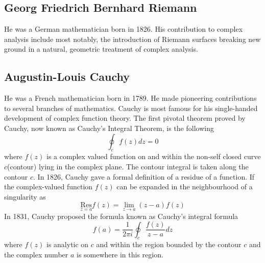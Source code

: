 \documentclass[12pt]{report}
\newcommand{\sps}{\\[0.2cm]}
\begin{document}
	\begin{center}
	\end{center}

	\subsection{Georg Friedrich Bernhard Riemann}
	He was a German mathematician born in 1826. His contribution to complex analysis include most notably, the introduction of Riemann surfaces breaking new ground in a natural, geometric treatment of complex analysis.
	
	\subsection{Augustin-Louis Cauchy}
	He was a French mathematician born in 1789. He made pioneering contributions to several branches of mathematics. Cauchy is most famous for his single-handed development of complex function theory. The first pivotal theorem proved by Cauchy, now known as Cauchy's Integral Theorem, is the following
	\begin{equation}
		\oint_c f(z)dz=0
	\end{equation}
	where $f(z)$ is a complex valued function on and within the non-self closed curve $c$(contour) lying in the complex plane. The contour integral is taken along the contour $c$. In 1826, Cauchy gave a formal definition of a residue of a function. If the complex-valued function $f(z)$ can be expanded in the neighbourhood of a singularity as
	\begin{equation}
		\underset{z=a}{\text{Res}} f(z) = \lim\limits_{z\rightarrow a}(z-a)f(z) 
	\end{equation}
	In 1831, Cauchy proposed the formula known as Cauchy's integral formula
	\begin{equation}
		f(a)=\frac{1}{2\pi i}\oint_c\frac{f(z)}{z-a}dz
	\end{equation}
	where $f(z)$ is analytic on $c$ and within the region bounded by the contour $c$ and the complex number $a$ is somewhere in this region.\sps
	
\end{document}
